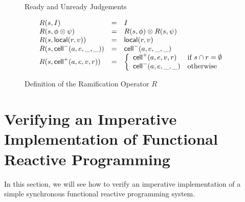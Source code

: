 \documentclass[preprint,natbib]{sigplanconf}
\begin{document}
\begin{figure}
\caption{Ready and Unready Judgements}
\label{readiness}
\end{figure}

\begin{figure}
  \begin{displaymath}
    \begin{array}{lcl}
      R(s, I)                 & = & I \\
      R(s, \phi \otimes \psi) & = & R(s, \phi) \otimes R(s, \psi) \\
      R(s, \mbox{\textsf{{local}}}({r}, {v}))   & = & \mbox{\textsf{{local}}}({r}, {v}) \\
      R(s, \mbox{\textsf{{cell}}}^{-}({a}, {e}, {\_}, {\_}))    & = & \mbox{\textsf{{cell}}}^{-}({a}, {e}, {\_}, {\_}) \\
      R(s, \mbox{\textsf{{cell}}}^{+}({a}, {e}, {v}, {r})) & = & \left\{\begin{array}{ll}
                                                \mbox{\textsf{{cell}}}^{+}({a}, {e}, {v}, {r}) 
                                              & \mbox{if } s \cap r = \emptyset \\
                                                \mbox{\textsf{{cell}}}^{-}({a}, {e}, {\_}, {\_})
                                              & \mbox{otherwise}
                                              \end{array}
                                       \right.
    \end{array}
  \end{displaymath}
\caption{Definition of the Ramification Operator $R$}
\label{ramify-def}
\end{figure}


\section{Verifying an Imperative Implementation of Functional Reactive Programming}

In this section, we will see how to verify an imperative
implementation of a simple synchronous functional reactive programming
system.
\end{document}
